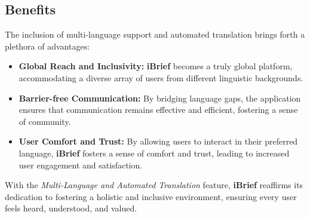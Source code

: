 \subsection{Benefits}
    The inclusion of multi-language support and automated translation brings forth a plethora of advantages:
    \begin{itemize}
        \item \textbf{Global Reach and Inclusivity:} \textbf{iBrief} becomes a truly global platform, accommodating a diverse array of users from different linguistic backgrounds.
        
        \item \textbf{Barrier-free Communication:} By bridging language gaps, the application ensures that communication remains effective and efficient, fostering a sense of community.
        
        \item \textbf{User Comfort and Trust:} By allowing users to interact in their preferred language, \textbf{iBrief} fosters a sense of comfort and trust, leading to increased user engagement and satisfaction.
    \end{itemize}

With the \textit{Multi-Language and Automated Translation} feature, \textbf{iBrief} reaffirms its dedication to fostering a holistic and inclusive environment, ensuring every user feels heard, understood, and valued.
